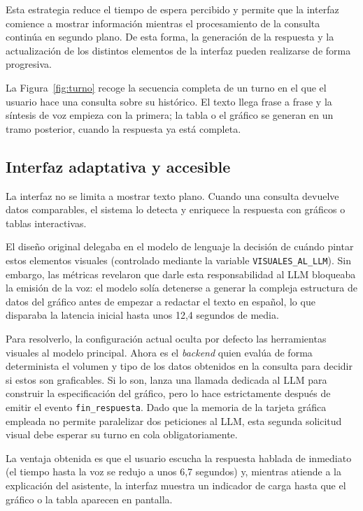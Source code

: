Esta estrategia reduce el tiempo de espera percibido y permite que la interfaz
comience a mostrar información mientras el procesamiento de la consulta
continúa en segundo plano. De esta forma, la generación de la 
respuesta y la actualización de los distintos elementos de 
la interfaz pueden realizarse de forma progresiva.

La Figura~\ref{fig:turno} recoge la secuencia completa de un turno en el que
el usuario hace una consulta sobre su histórico. El texto llega frase a frase y
la síntesis de voz empieza con la primera; la tabla o el gráfico se generan en
un tramo posterior, cuando la respuesta ya está completa.



\subsection{Interfaz adaptativa y accesible}

La interfaz no se limita a mostrar texto plano. Cuando una consulta 
devuelve datos comparables, el sistema lo detecta y enriquece la 
respuesta con gráficos o tablas interactivas.

El diseño original delegaba en el modelo de lenguaje la decisión 
de cuándo pintar estos elementos visuales (controlado mediante 
la variable \texttt{VISUALES\_AL\_LLM}). Sin embargo, las métricas 
revelaron que darle esta responsabilidad al LLM bloqueaba la 
emisión de la voz: el modelo solía detenerse a generar la compleja 
estructura de datos del gráfico antes de empezar a redactar el 
texto en español, lo que disparaba la latencia inicial hasta unos 12,4 segundos de media.

Para resolverlo, la configuración actual oculta por defecto las 
herramientas visuales al modelo principal. Ahora es el 
\textit{backend} quien evalúa de forma determinista el volumen y 
tipo de los datos obtenidos en la consulta para decidir si estos 
son graficables. Si lo son, lanza una llamada dedicada al LLM para 
construir la especificación del gráfico, pero lo hace estrictamente
después de emitir el evento \texttt{fin\_respuesta}. Dado que 
la memoria de la tarjeta gráfica empleada no permite paralelizar 
dos peticiones al LLM, esta segunda solicitud visual debe 
esperar su turno en cola obligatoriamente.

La ventaja obtenida es que el usuario escucha la respuesta hablada 
de inmediato (el tiempo hasta la voz se redujo a unos 6,7 segundos) y, 
mientras atiende a la explicación del asistente, la interfaz 
muestra un indicador de carga hasta que el gráfico o la tabla 
aparecen en pantalla. 
